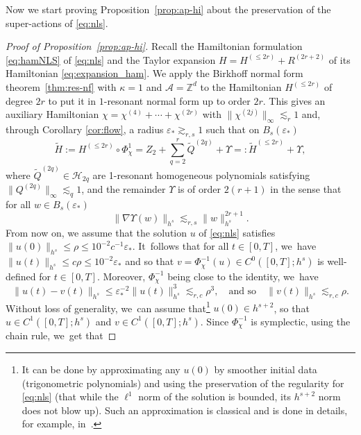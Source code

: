 \documentclass[JEP,XML,SOM,Unicode,published]{cedram}
\theoremstyle{plain}
\theoremstyle{definition}
\newcommand{\1}{\mathbf{1}}
\begin{document}
Now we start proving Proposition~\ref{prop:ap-hi} about the preservation of the super-actions of \eqref{eq:nls}.

\begin{proof}[Proof of Proposition~\ref{prop:ap-hi}]
Recall the Hamiltonian formulation \eqref{eq:hamNLS} of \eqref{eq:nls} and the Taylor expansion $H = H^{(\leq 2r)} + R^{(2r+2)}$ of its Hamiltonian \eqref{eq:expansion_ham}. We apply the Birkhoff normal form theorem~\ref{thm:res-nf} with $\kappa=1$ and $\mathcal{A}= \mathbb{Z}^d$ to the Hamiltonian $H^{(\leq 2r)}$ of degree $2r$ to put it in $1$-resonant normal form up to order $2r$. This gives an auxiliary Hamiltonian $\chi = \chi^{(4)} + \cdots + \chi^{(2r)}$ with $\| \chi^{(2j)}\|_\infty \lesssim_r 1$ and, through Corollary \ref{cor:flow}, a radius $\varepsilon_\ast \gtrsim_{r,s} 1$ such that on $B_s(\varepsilon_*)$
\[
\widetilde{H}:=H^{(\leq 2r)}\circ\Phi_\chi^1 =Z_2+ \sum_{q=2}^{r}\widetilde{Q}^{(2q)}+\Upsilon =: \widetilde{H}^{(\leq 2r)} + \Upsilon,
\]
where $\widetilde{Q}^{(2q)} \in \mathcal{H}_{2q}$ are 1-resonant homogeneous polynomials satisfying $\| Q^{(2q)}\|_{\infty} \lesssim_q 1 $, and
the remainder $\Upsilon$ is of order $2(r+1)$ in the sense that for all $w\in B_s(\varepsilon_*)$
\begin{equation}
\label{eq:bientotnoel}
\|\nabla \Upsilon(w)\|_{h^{s}}\lesssim_{r,s} \| w\|_{h^s}^{2r+1}.
\end{equation}
From now on, we assume that the solution $u$ of \eqref{eq:nls} satisfies \hbox{$\| u(0) \|_{h^s} \!\!\leq\! \rho \!\leq\! 10^{-2}\! c^{-1}\!\varepsilon_\ast$}. It~follows that for all $t\in [0,T]$, we~have $\|u(t) \|_{h^s} \leq c \rho\leq 10^{-2} \varepsilon_\ast$ and so that $v = \Phi_\chi^{-1}(u) \in C^0([0,T];h^s)$ is well-defined for $t\in [0,T]$. Moreover, $ \Phi_\chi^{-1}$ being close to the identity, we~have
\begin{equation}
\label{eq:pr-var}
\|u(t)-v(t)\|_{h^{s}}\leq \varepsilon_{\ast}^{-2}\|u(t)\|_{h^{s}}^{3} \lesssim_{r,c} \rho^3,\quad \text{and \ so}\quad \|v(t)\|_{h^{s}}\lesssim_{r,c} \rho.
\end{equation}
Without loss of generality, we~can assume that\footnote{It can be done by approximating any $u(0)$ by smoother initial data (\eg trigonometric polynomials) and using the preservation of the regularity for \eqref{eq:nls} (\ie that while the $\ell^1$ norm of the solution is bounded, its $h^{s+2}$ norm does not blow up). Such an approximation is classical and is done in details, for example, in~\cite{BG22}.} $u(0) \in h^{s+2}$, so that $u\in C^1([0,T];h^s)$ and $v \in C^1([0,T];h^s)$. Since $\Phi_\chi^{-1}$ is symplectic, using the chain rule, we~get that

\end{proof}
\end{document}
